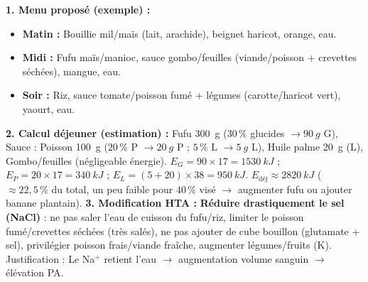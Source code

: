 \documentclass[11pt]{article}
\begin{document}
\begin{corrige}
\textbf{1. Menu proposé (exemple) :}
\begin{itemize}
\item \textbf{Matin :} Bouillie mil/maïs (lait, arachide), beignet haricot, orange, eau.
\item \textbf{Midi :} Fufu maïs/manioc, sauce gombo/feuilles (viande/poisson + crevettes séchées), mangue, eau.
\item \textbf{Soir :} Riz, sauce tomate/poisson fumé + légumes (carotte/haricot vert), yaourt, eau.
\end{itemize}
\textbf{2. Calcul déjeuner (estimation) :}
Fufu \SI{300}{g} ($30\,\%$ glucides $\rightarrow \SI{90}{g}$ G), Sauce : Poisson \SI{100}{g} ($20\,\%$ P $\rightarrow \SI{20}{g}$ P ; $5\,\%$ L $\rightarrow \SI{5}{g}$ L), Huile palme \SI{20}{g} (L), Gombo/feuilles (négligeable énergie).
$E_G = 90 \times 17 = \SI{1530}{kJ}$ ; $E_P = 20 \times 17 = \SI{340}{kJ}$ ; $E_L = (5+20) \times 38 = \SI{950}{kJ}$.
$E_{\text{déj}} \approx \SI{2820}{kJ}$ ($\approx 22,5\,\%$ du total, un peu faible pour $40\,\%$ visé $\rightarrow$ augmenter fufu ou ajouter banane plantain).
\textbf{3. Modification HTA :} \textbf{Réduire drastiquement le sel (NaCl)} : ne pas saler l'eau de cuisson du fufu/riz, limiter le poisson fumé/crevettes séchées (très salés), ne pas ajouter de cube bouillon (glutamate + sel), privilégier poisson frais/viande fraîche, augmenter légumes/fruits (K). Justification : Le Na$^+$ retient l'eau $\rightarrow$ augmentation volume sanguin $\rightarrow$ élévation PA.
\end{corrige}
\end{document}
